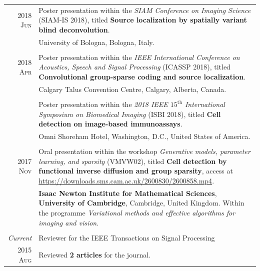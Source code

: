 \documentclass[a4paper,10pt]{article}
\begin{document}
    \begin{tabular}{r|p{13cm}}
      
      \textsc{2018 Jun} & Poster presentation within the \emph{SIAM Conference on Imaging Science}
			  (SIAM-IS 2018), titled \textbf{Source localization by spatially
			  variant blind deconvolution}. \\
			& \footnotesize{University of Bologna, Bologna, Italy.}\\
      \multicolumn{2}{c}{} \\
    
      \textsc{2018 Apr} & Poster presentation within the \emph{IEEE International Conference 
			  on Acoustics, Speech and Signal Processing} (ICASSP 2018), titled
			  \textbf{Convolutional group-sparse coding and source localization}. \\
			& \footnotesize{Calgary Talus Convention Centre, Calgary, Alberta, Canada.} \\
			& \\
			& Poster presentation within the \emph{2018 IEEE $15^{\mathrm{th}}$ International
			  Symposium on Biomedical Imaging} (ISBI 2018), titled
			  \textbf{Cell detection on image-based immunoassays}.\\
			& \footnotesize{Omni Shoreham Hotel, Washington, D.C., United States of America.} \\
      \multicolumn{2}{c}{} \\
      
      \textsc{2017 Nov} & Oral presentation within the workshop \emph{Generative models, 
			  parameter learning, and sparsity} (VMVW02), titled
			  \textbf{Cell detection by functional inverse diffusion and group sparsity},
			  access at \url{https://downloads.sms.cam.ac.uk/2600830/2600858.mp4}. \\
			& \footnotesize{\textbf{Isaac Newton Institute for Mathematical Sciences},
			  \textbf{University of Cambridge}, Cambridge, United Kingdom.
			  Within the programme \emph{Variational methods and effective
			  algorithms for imaging and vision}.}\\
      \multicolumn{2}{c}{} \\
      
      \emph{Current}	& Reviewer for the IEEE Transactions on Signal Processing \\
      \textsc{2015 Aug} & \footnotesize{Reviewed \textbf{2 articles} for the journal.} \\
      
    \end{tabular}
\end{document}
